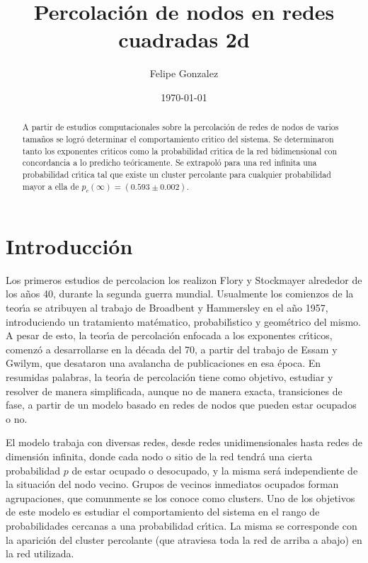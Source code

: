 \documentclass[
 reprint,
 amsmath,amssymb,
 aps,
]{revtex4-1}
\begin{document}

\title{Percolaci\'on de nodos en redes cuadradas 2d}
\author{Felipe Gonzalez}

\date{\today}

\begin{abstract}
A partir de estudios computacionales sobre la percolaci\'on de redes de nodos de varios tama\~nos se logr\'o determinar el comportamiento cr\'\i tico del sistema. Se determinaron tanto los exponentes cr\'\i ticos como la probabilidad cr\'\i tica de la red bidimensional con concordancia a lo predicho te\'oricamente. Se extrapol\'o para una red infinita una probabilidad cr\'\i tica tal que existe un cluster percolante para cualquier probabilidad mayor a ella de $p_c(\infty) = (0.593 \pm 0.002)$.

\end{abstract}

\maketitle

\section{Introducci\'on}

Los primeros estudios de percolacion los realizon Flory y Stockmayer alrededor de los a\~nos 40, durante la segunda guerra mundial. Usualmente los comienzos de la teor\'\i a se atribuyen al trabajo de Broadbent y Hammersley en el a\~no 1957, introduciendo un tratamiento mat\'ematico, probabil\'\i stico y geom\'etrico del mismo. A pesar de esto, la teor\'\i a de percolaci\'on enfocada a los exponentes cr\'\i ticos, comenz\'o a desarrollarse en la d\'ecada del 70, a partir del trabajo de Essam y Gwilym, que desataron una avalancha de publicaciones en esa \'epoca. En resumidas palabras, la teor\'\i a de percolaci\'on tiene como objetivo, estudiar y resolver de manera simplificada, aunque no de manera exacta, transiciones de fase, a partir de un modelo basado en redes de nodos que pueden estar ocupados o no.

El modelo trabaja con diversas redes, desde redes unidimensionales hasta redes de dimensi\'on infinita, donde cada nodo o sitio de la red tendr\'a una cierta probabilidad $p$ de estar ocupado o desocupado, y la misma ser\'a independiente de la situaci\'on del nodo vecino. Grupos de vecinos inmediatos ocupados forman agrupaciones, que comunmente se los conoce como clusters. Uno de los objetivos de este modelo es estudiar el comportamiento del sistema en el rango de probabilidades cercanas a una probabilidad cr\'\i tica. La misma se corresponde con la aparici\'on del cluster percolante (que atraviesa toda la red de arriba a abajo) en la red utilizada.
\end{document}
